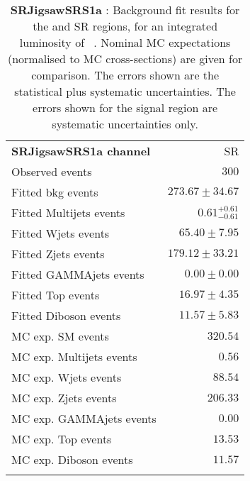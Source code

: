

\begin{table}
\begin{center}
\setlength{\tabcolsep}{0.0pc}
{\tiny
\begin{tabular*}{\textwidth}{@{\extracolsep{\fill}}lr}
\noalign{\smallskip}\hline\noalign{\smallskip}
{\bf SRJigsawSRS1a channel}           & SR              \\[-0.05cm]
\noalign{\smallskip}\hline\noalign{\smallskip}
Observed events          & $300$                    \\
\noalign{\smallskip}\hline\noalign{\smallskip}
Fitted bkg events         & $273.67 \pm 34.67$              \\
\noalign{\smallskip}\hline\noalign{\smallskip}
        Fitted Multijets events         & $0.61_{-0.61}^{+0.61}$              \\
        Fitted Wjets events         & $65.40 \pm 7.95$              \\
        Fitted Zjets events         & $179.12 \pm 33.21$              \\
        Fitted GAMMAjets events         & $0.00 \pm 0.00$              \\
        Fitted Top events         & $16.97 \pm 4.35$              \\
        Fitted Diboson events         & $11.57 \pm 5.83$              \\
 \noalign{\smallskip}\hline\noalign{\smallskip}
MC exp. SM events              & $320.54$              \\
\noalign{\smallskip}\hline\noalign{\smallskip}
        MC exp. Multijets events         & $0.56$              \\
        MC exp. Wjets events         & $88.54$              \\
        MC exp. Zjets events         & $206.33$              \\
        MC exp. GAMMAjets events         & $0.00$              \\
        MC exp. Top events         & $13.53$              \\
        MC exp. Diboson events         & $11.57$              \\
\noalign{\smallskip}\hline\noalign{\smallskip}
\end{tabular*}
}
\end{center}
\caption{{\bf SRJigsawSRS1a} : Background fit results for the  and SR regions, for an integrated luminosity of \ourintlumi~\ifb. Nominal MC expectations (normalised to MC cross-sections) are given for comparison. The errors shown are the statistical plus systematic uncertainties. The errors shown for the signal region are systematic uncertainties only.}
\label{table.results.systematics.in.logL.fit.SR.SRJigsawSRS1a}
\end{table}
%